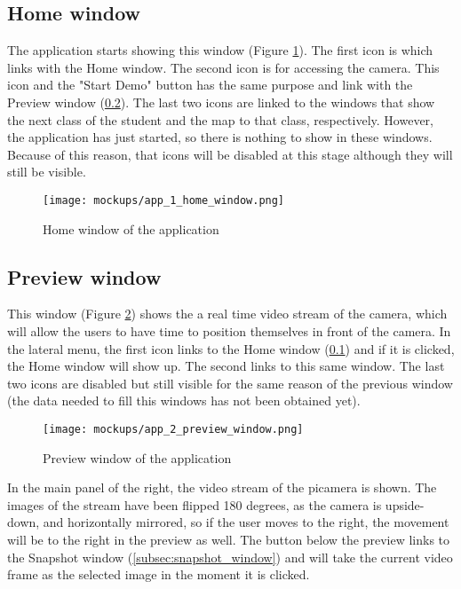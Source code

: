 	\subsection{Home window}
	\label{subsec:home_window}
	
	The application starts showing this window (Figure \ref{fig:home_window}). The first icon is which links with the Home window. The second icon is for accessing the camera. This icon and the "Start Demo" button has the same purpose and link with the Preview window (\ref{subsec:preview_window}). The last two icons are linked to the windows that show the next class of the student and the map to that class, respectively. However, the application has just started, so there is nothing to show in these windows. Because of this reason, that icons will be disabled at this stage although they will still be visible.  

	\begin{figure}[!ht]
		\centering
		\texttt{[image: mockups/app\_1\_home\_window.png]}
		\caption{Home window of the application}
		\label{fig:home_window}
	\end{figure}

	\subsection{Preview window}
	\label{subsec:preview_window}

	This window (Figure \ref{fig:preview_window}) shows the a real time video stream of the camera, which will allow the users to have time to position themselves in front of the camera. In the lateral menu, the first icon links to the Home window (\ref{subsec:home_window}) and if it is clicked, the Home window will show up. The second links to this same window. The last two icons are disabled but still visible for the same reason of the previous window (the data needed to fill this windows has not been obtained yet).

	\begin{figure}[!ht]
		\centering
		\texttt{[image: mockups/app\_2\_preview\_window.png]}
		\caption{Preview window of the application}
		\label{fig:preview_window}
	\end{figure}

	In the main panel of the right, the video stream of the \gls{picamera} is shown. The images of the stream have been flipped 180 degrees, as the camera is upside-down, and horizontally mirrored, so if the user moves to the right, the movement will be to the right in the preview as well. The button below the preview links to the Snapshot window (\ref{subsec:snapshot_window}) and will take the current video frame as the selected image in the moment it is clicked.

